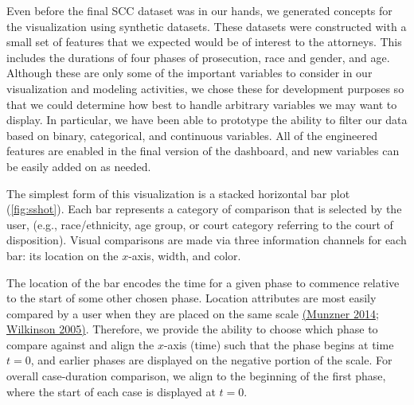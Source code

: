 \documentclass{AISB2008}
\begin{document}
Even before the final SCC dataset was in our hands, we generated
concepts for the visualization using synthetic datasets. These
datasets were constructed with a small set of features that we
expected would be of interest to the attorneys. This includes the
durations of four phases of prosecution, race and gender, and
age. Although these are only some of the important variables to
consider in our visualization and modeling activities, we chose these
for development purposes so that we could determine how best to handle
arbitrary variables we may want to display. In particular, we have
been able to prototype the ability to filter our data based on binary,
categorical, and continuous variables. All of the engineered features
are enabled in the final version of the dashboard, and new variables
can be easily added on as needed.

The simplest form of this visualization is a stacked horizontal bar
plot (\autoref{fig:sshot}). Each bar represents a category of
comparison that is selected by the user, (e.g., race/ethnicity, age
group, or court category referring to the court of
disposition). Visual comparisons are made via three information
channels for each bar: its location on the $x$-axis, width, and color.

The location of the bar encodes the time for a given phase to commence
relative to the start of some other chosen phase. Location attributes
are most easily compared by a user when they are placed on the same
scale \hyperref[csl:13]{(Munzner 2014}; \hyperref[csl:14]{Wilkinson
  2005)}. Therefore, we provide the ability to choose which phase to
compare against and align the $x$-axis (time) such that the phase
begins at time $t = 0$, and earlier phases are displayed on the
negative portion of the scale. For overall case-duration comparison,
we align to the beginning of the first phase, where the start of each
case is displayed at $t = 0$.
\end{document}
